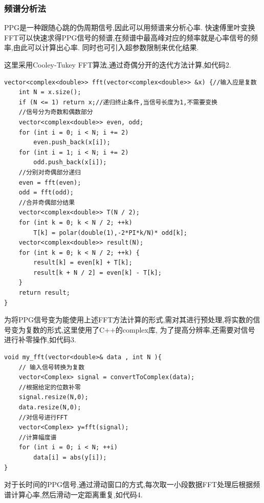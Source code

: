 \documentclass[12pt, a4paper, oneside]{ctexart}
\begin{document}
    \subsubsection{频谱分析法}
    PPG是一种跟随心跳的伪周期信号,因此可以用频谱来分析心率. 快速傅里叶变换FFT可以快速求得PPG信号的频谱,在频谱中最高峰对应的频率就是心率信号的频率,由此可以计算出心率.
    同时也可引入超参数限制来优化结果.

    这里采用Cooley-Tukey FFT算法,通过奇偶分开的迭代方法计算,如代码2.
    \newpage
    \begin{lstlisting}[caption={FFT处理函数}]
vector<complex<double>> fft(vector<complex<double>> &x) {//输入应是复数
    int N = x.size();
    if (N <= 1) return x;//递归终止条件,当信号长度为1,不需要变换
    //信号分为奇数和偶数部分
    vector<complex<double>> even, odd;
    for (int i = 0; i < N; i += 2)
        even.push_back(x[i]);
    for (int i = 1; i < N; i += 2)
        odd.push_back(x[i]);
    //分别对奇偶部分递归    
    even = fft(even);
    odd = fft(odd);
    //合并奇偶部分结果
    vector<complex<double>> T(N / 2);
    for (int k = 0; k < N / 2; ++k)
        T[k] = polar(double(1),-2*PI*k/N)* odd[k];
    vector<complex<double>> result(N);
    for (int k = 0; k < N / 2; ++k) {
        result[k] = even[k] + T[k];
        result[k + N / 2] = even[k] - T[k];
    }
    return result;
}
    \end{lstlisting}    

    \newpage
    为将PPG信号变为能使用上述FFT方法计算的形式,需对其进行预处理,将实数的信号变为复数的形式,这里使用了C++的complex库,
    为了提高分辨率,还需要对信号进行补零操作,如代码3.

    
    \begin{lstlisting}[caption={对PPG信号的FFT处理函数}]
void my_fft(vector<double>& data , int N ){
    // 输入信号转换为复数
    vector<Complex> signal = convertToComplex(data);
    //根据给定的位数补零
    signal.resize(N,0); 
    data.resize(N,0);
    //对信号进行FFT
    vector<Complex> y=fft(signal);
    //计算幅度谱
    for (int i = 0; i < N; ++i) 
        data[i] = abs(y[i]); 
}
    \end{lstlisting} 

    对于长时间的PPG信号,通过滑动窗口的方式,每次取一小段数据FFT处理后根据频谱计算心率,然后滑动一定距离重复,如代码4.
    
\end{document}
